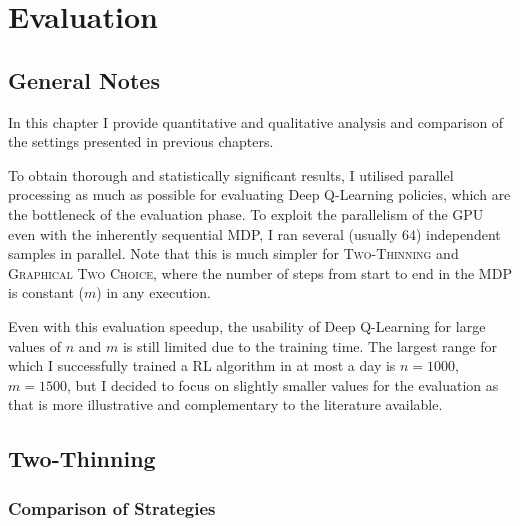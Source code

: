 \chapter{Evaluation}\label{evaluation}


\ifpdf
    \graphicspath{{Chapter3/Figs/Raster/}{Chapter3/Figs/PDF/}{Chapter3/Figs/}}
\else
    \graphicspath{{Chapter3/Figs/Vector/}{Chapter3/Figs/}}
\fi



\section{General Notes}

In this chapter I provide quantitative and qualitative analysis and comparison of the settings presented in previous chapters.


To obtain thorough and statistically significant results, I utilised parallel processing as much as possible for evaluating Deep Q-Learning policies, which are the bottleneck of the evaluation phase. To exploit the parallelism of the GPU even with the inherently sequential MDP, I ran several (usually $64$) independent samples in parallel. Note that this is much simpler for \textsc{Two-Thinning} and \textsc{Graphical Two Choice}, where the number of steps from start to end in the MDP is constant ($m$) in any execution.


Even with this evaluation speedup, the usability of Deep Q-Learning for large values of $n$ and $m$ is still limited due to the training time. The largest range for which I successfully trained a RL algorithm in at most a day is $n=1000$, $m=1500$, but I decided to focus on slightly smaller values for the evaluation as that is more illustrative and complementary to the literature available.





\section{Two-Thinning}


\subsection{Comparison of Strategies}


